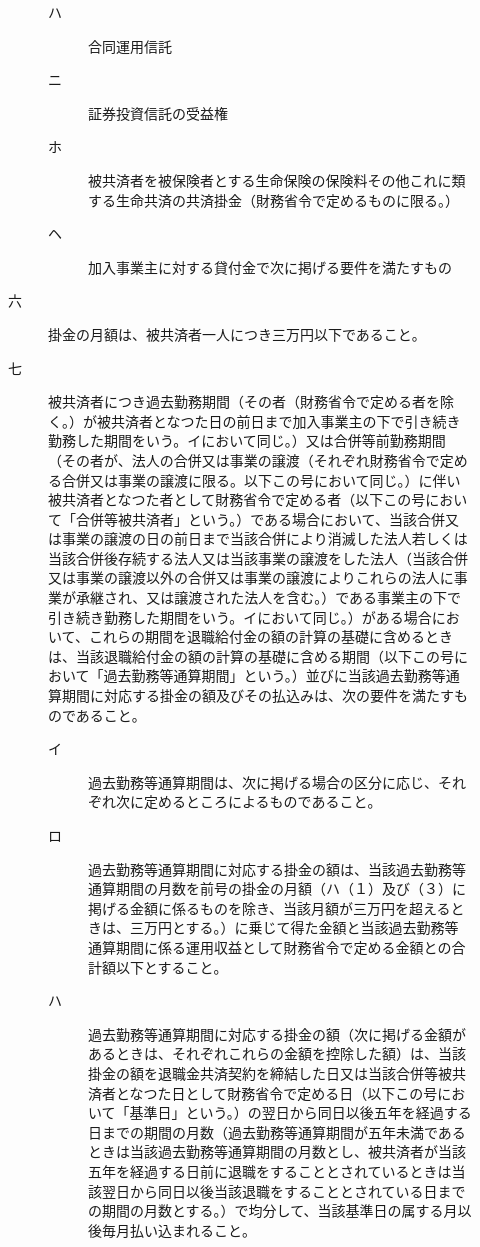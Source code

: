 \documentclass[twocolumn,a4j,10pt]{ltjtarticle}
\begin{document}
\begin{description}
\begin{description}
\begin{description}
\item[ハ]合同運用信託
\item[ニ]証券投資信託の受益権
\item[ホ]被共済者を被保険者とする生命保険の保険料その他これに類する生命共済の共済掛金（財務省令で定めるものに限る。）
\item[ヘ]加入事業主に対する貸付金で次に掲げる要件を満たすもの
\end{description}
\item[六]掛金の月額は、被共済者一人につき三万円以下であること。
\item[七]被共済者につき過去勤務期間（その者（財務省令で定める者を除く。）が被共済者となつた日の前日まで加入事業主の下で引き続き勤務した期間をいう。イにおいて同じ。）又は合併等前勤務期間（その者が、法人の合併又は事業の譲渡（それぞれ財務省令で定める合併又は事業の譲渡に限る。以下この号において同じ。）に伴い被共済者となつた者として財務省令で定める者（以下この号において「合併等被共済者」という。）である場合において、当該合併又は事業の譲渡の日の前日まで当該合併により消滅した法人若しくは当該合併後存続する法人又は当該事業の譲渡をした法人（当該合併又は事業の譲渡以外の合併又は事業の譲渡によりこれらの法人に事業が承継され、又は譲渡された法人を含む。）である事業主の下で引き続き勤務した期間をいう。イにおいて同じ。）がある場合において、これらの期間を退職給付金の額の計算の基礎に含めるときは、当該退職給付金の額の計算の基礎に含める期間（以下この号において「過去勤務等通算期間」という。）並びに当該過去勤務等通算期間に対応する掛金の額及びその払込みは、次の要件を満たすものであること。
\begin{description}
\item[イ]過去勤務等通算期間は、次に掲げる場合の区分に応じ、それぞれ次に定めるところによるものであること。
\item[ロ]過去勤務等通算期間に対応する掛金の額は、当該過去勤務等通算期間の月数を前号の掛金の月額（ハ（１）及び（３）に掲げる金額に係るものを除き、当該月額が三万円を超えるときは、三万円とする。）に乗じて得た金額と当該過去勤務等通算期間に係る運用収益として財務省令で定める金額との合計額以下とすること。
\item[ハ]過去勤務等通算期間に対応する掛金の額（次に掲げる金額があるときは、それぞれこれらの金額を控除した額）は、当該掛金の額を退職金共済契約を締結した日又は当該合併等被共済者となつた日として財務省令で定める日（以下この号において「基準日」という。）の翌日から同日以後五年を経過する日までの期間の月数（過去勤務等通算期間が五年未満であるときは当該過去勤務等通算期間の月数とし、被共済者が当該五年を経過する日前に退職をすることとされているときは当該翌日から同日以後当該退職をすることとされている日までの期間の月数とする。）で均分して、当該基準日の属する月以後毎月払い込まれること。

\end{description}
\end{description}
\end{description}
\end{document}
